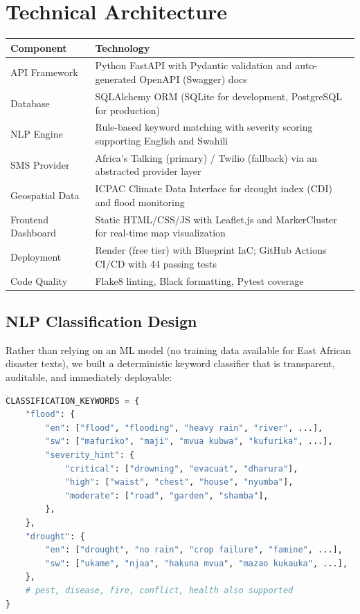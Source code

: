 \documentclass[11pt,a4paper]{article}
\begin{document}
\section{Technical Architecture}

\begin{center}
  \small
  \begin{tabularx}{\textwidth}{lX}
    \toprule
    \textbf{Component} & \textbf{Technology} \\
    \midrule
    API Framework & Python FastAPI with Pydantic validation and auto-generated OpenAPI (Swagger) docs \\
    Database & SQLAlchemy ORM (SQLite for development, PostgreSQL for production) \\
    NLP Engine & Rule-based keyword matching with severity scoring supporting English and Swahili \\
    SMS Provider & Africa's Talking (primary) / Twilio (fallback) via an abstracted provider layer \\
    Geospatial Data & ICPAC Climate Data Interface for drought index (CDI) and flood monitoring \\
    Frontend Dashboard & Static HTML/CSS/JS with Leaflet.js and MarkerCluster for real-time map visualization \\
    Deployment & Render (free tier) with Blueprint IaC; GitHub Actions CI/CD with 44 passing tests \\
    Code Quality & Flake8 linting, Black formatting, Pytest coverage \\
    \bottomrule
  \end{tabularx}
\end{center}

\subsection{NLP Classification Design}

Rather than relying on an ML model (no training data available for East African disaster texts), we built a deterministic keyword classifier that is transparent, auditable, and immediately deployable:

\begin{lstlisting}[language=Python, caption=Core NLP classification structure]
CLASSIFICATION_KEYWORDS = {
    "flood": {
        "en": ["flood", "flooding", "heavy rain", "river", ...],
        "sw": ["mafuriko", "maji", "mvua kubwa", "kufurika", ...],
        "severity_hint": {
            "critical": ["drowning", "evacuat", "dharura"],
            "high": ["waist", "chest", "house", "nyumba"],
            "moderate": ["road", "garden", "shamba"],
        },
    },
    "drought": {
        "en": ["drought", "no rain", "crop failure", "famine", ...],
        "sw": ["ukame", "njaa", "hakuna mvua", "mazao kukauka", ...],
    },
    # pest, disease, fire, conflict, health also supported
}
\end{lstlisting}
\end{document}
